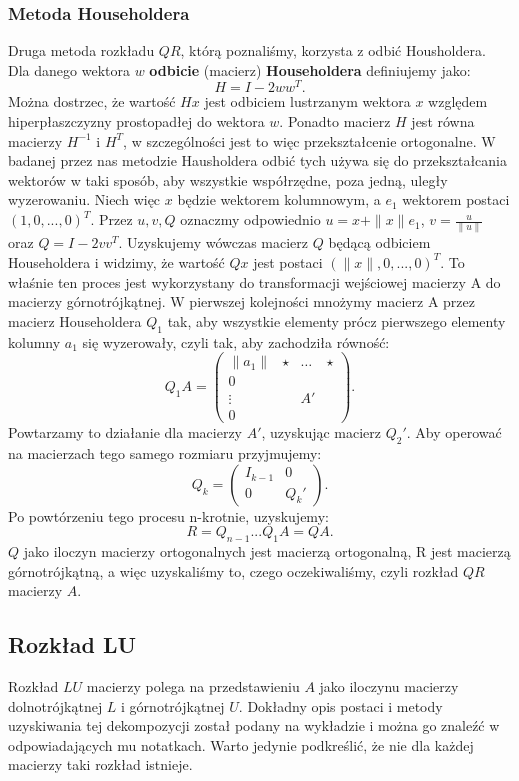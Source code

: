 \subsubsection{Metoda Householdera}
Druga metoda rozkładu $QR$, którą poznaliśmy, korzysta z odbić Housholdera.
Dla danego wektora $w$ \textbf{odbicie} (macierz) \textbf{Householdera}
definiujemy jako:
$$H=I-2ww^T.$$
Można dostrzec, że wartość $Hx$ jest odbiciem lustrzanym wektora $x$ względem
hiperpłaszczyzny prostopadłej do wektora $w$. Ponadto macierz $H$ jest równa
macierzy $H^{-1}$ i $H^T$, w szczególności jest to więc przekształcenie
ortogonalne. W badanej przez nas metodzie Hausholdera odbić tych używa się
do przekształcania wektorów w taki sposób, aby wszystkie współrzędne,
poza jedną, uległy wyzerowaniu. Niech więc $x$ będzie wektorem kolumnowym,
a $e_1$ wektorem postaci $(1,0,...,0)^T$. Przez $u, v, Q$ oznaczmy odpowiednio $u=x+\|x\|e_1$,
$v=\frac{u}{\|u\|}$ oraz $Q=I-2vv^T$. Uzyskujemy wówczas macierz $Q$
będącą odbiciem Householdera i  widzimy, że wartość $Qx$ jest postaci $(\|x\|,0,...,0)^T$.
To właśnie ten proces jest wykorzystany do transformacji wejściowej
macierzy A do macierzy górnotrójkątnej. W pierwszej kolejności mnożymy
macierz A przez macierz Householdera $Q_1$ tak, aby wszystkie elementy
prócz pierwszego elementy kolumny $a_1$ się wyzerowały, czyli tak, aby
zachodziła równość:
$$ Q_1A = \begin{pmatrix} \|a_1\|&\star&\dots&\star\\ 0 & & & \\ \vdots & &
A' & \\ 0 & & & \end{pmatrix}.$$
Powtarzamy to działanie dla macierzy $A'$, uzyskując macierz $Q_2'$.
Aby operować na macierzach tego samego rozmiaru przyjmujemy:
$$Q_k=\begin{pmatrix} I_{k-1} & 0 \\ 0 & Q_k' \end{pmatrix}.$$
Po powtórzeniu tego procesu n-krotnie, uzyskujemy:
$$R=Q_{n-1}...Q_1A=QA.$$
$Q$ jako iloczyn macierzy ortogonalnych jest macierzą ortogonalną, R jest
macierzą górnotrójkątną, a więc uzyskaliśmy to, czego oczekiwaliśmy, czyli
rozkład $QR$ macierzy $A$.
\subsection{Rozkład LU}
Rozkład $LU$ macierzy polega na przedstawieniu $A$ jako iloczynu macierzy
dolnotrójkątnej $L$ i górnotrójkątnej $U$. Dokładny opis postaci i metody
uzyskiwania tej dekompozycji został podany na wykładzie i można go znaleźć w
odpowiadających mu notatkach. Warto jedynie podkreślić, że nie dla każdej
macierzy taki rozkład istnieje.
